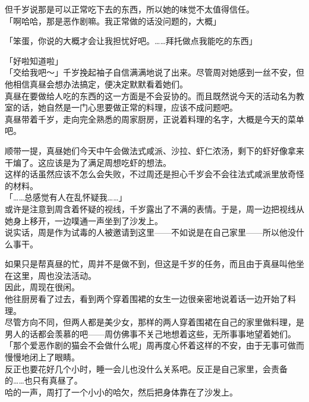 但千岁说那是可以正常吃下去的东西，所以她的味觉不太值得信任。\\

「啊哈哈，那是恶作剧嘛。我正常做的话没问题的，大概」

「笨蛋，你说的大概才会让我担忧好吧。……拜托做点我能吃的东西」

「好啦知道啦」\\

「交给我吧～」千岁挽起袖子自信满满地说了出来。尽管周对她感到一丝不安，但他相信真昼会想办法搞定，便决定默默看着她们。\\

真昼在要做给人吃的东西的这一方面是不会妥协的。而且既然说今天的活动名为教室的话，她自然是一门心思要做正常的料理，应该不成问题吧。\\

真昼带着千岁，走向完全熟悉的周家厨房，正说着料理的名字，大概是今天的菜单吧。

顺带一提，真昼她们今天中午会做法式咸派、沙拉、虾仁浓汤，剩下的虾好像拿来干煸了。这应该是为了满足周想吃虾的想法。\\

这样的话虽然应该不怎么会失败，不过周还是担心千岁会不会往法式咸派里放奇怪的材料。\\

「……总感觉有人在乱怀疑我……」\\

或许是注意到周含着怀疑的视线，千岁露出了不满的表情。于是，周一边把视线从她身上移开，一边噗通一声坐到了沙发上。\\

说实话，周是作为试毒的人被邀请到这里——不如说是在自己家里——所以他没什么事干。

如果只是帮真昼的忙，周并不是做不到，但这是千岁的任务，而且由于真昼叫他坐在这里，周也没法活动。\\

因此，周现在很闲。\\

他往厨房看了过去，看到两个穿着围裙的女生一边很亲密地说着话一边开始了料理。\\

尽管方向不同，但两人都是美少女，那样的两人穿着围裙在自己的家里做料理，是男人的话都会羡慕的吧——周仿佛事不关己地想着这些，无所事事地望着她们。\\

「那个爱恶作剧的猫会不会做什么呢」周再度心怀着这样的不安，由于无事可做而慢慢地闭上了眼睛。\\

反正也要花好几个小时，睡一会儿也没什么关系吧。反正是自己家里，会责备的……也只有真昼了。\\

哈的一声，周打了一个小小的哈欠，然后把身体靠在了沙发上。
